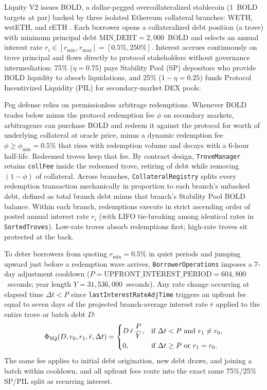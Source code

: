 Liquity V2 issues BOLD, a dollar-pegged overcollateralized stablecoin (1~BOLD targets  at par) backed by three isolated Ethereum collateral branches: WETH, wstETH, and rETH \citep{liquity2024whitepaper,liquity2024docs}. Each borrower opens a collateralized debt position (a trove) with minimum principal debt $\text{MIN\_DEBT} = 2{,}000$~BOLD and selects an annual interest rate $r_i \in [r_{\min}, r_{\max}] = [0.5\%, 250\%]$. Interest accrues continuously on trove principal and flows directly to protocol stakeholders without governance intermediation: 75\% ($\eta = 0.75$) pays Stability Pool (SP) depositors who provide BOLD liquidity to absorb liquidations, and 25\% ($1 - \eta = 0.25$) funds Protocol Incentivized Liquidity (PIL) for secondary-market DEX pools.

Peg defense relies on permissionless arbitrage redemptions. Whenever BOLD trades below  minus the protocol redemption fee $\phi$ on secondary markets, arbitrageurs can purchase BOLD and redeem it against the protocol for  worth of underlying collateral at oracle price, minus a dynamic redemption fee $\phi \ge \phi_{\min} = 0.5\%$ that rises with redemption volume and decays with a 6-hour half-life. Redeemed troves keep that fee. By contract design, \texttt{TroveManager} retains \texttt{collFee} inside the redeemed trove, retiring  of debt while removing \usd$(1 - \phi)$ of collateral. Across branches, \texttt{CollateralRegistry} splits every redemption transaction mechanically in proportion to each branch's unbacked debt, defined as total branch debt minus that branch's Stability Pool BOLD balance. Within each branch, redemptions execute in strict ascending order of posted annual interest rate $r_i$ (with LIFO tie-breaking among identical rates in \texttt{SortedTroves}). Low-rate troves absorb redemptions first; high-rate troves sit protected at the back.

To deter borrowers from quoting $r_{\min} = 0.5\%$ in quiet periods and jumping upward just before a redemption wave arrives, \texttt{BorrowerOperations} imposes a 7-day adjustment cooldown ($P = \text{UPFRONT\_INTEREST\_PERIOD} = 604{,}800$~seconds; year length $Y = 31{,}536{,}000$~seconds). Any rate change occurring at elapsed time $\Delta t < P$ since \texttt{lastInterestRateAdjTime} triggers an upfront fee equal to seven days of the projected branch-average interest rate $\bar{r}$ applied to the entire trove or batch debt $D$:
\begin{equation}\label{eq:sq_fee}
\Phi_{\text{SQ}}(D, r_0, r_1, \bar{r}, \Delta t) =
\begin{cases}
D\,\bar{r}\,\dfrac{P}{Y}, & \text{if } \Delta t < P \text{ and } r_1 \ne r_0,\\[6pt]
0, & \text{if } \Delta t \ge P \text{ or } r_1 = r_0.
\end{cases}
\end{equation}
The same fee applies to initial debt origination, new debt draws, and joining a batch within cooldown, and all upfront fees route into the exact same 75\%/25\% SP/PIL split as recurring interest.

